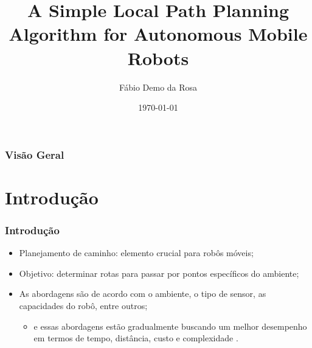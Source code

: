 \documentclass[xcolor=dvipsnames, aspectratio=169]{beamer}
\title[A Simple Local Path Planning Algorithm for Autonomous Mobile Robots]{A Simple Local Path Planning Algorithm for Autonomous Mobile Robots} %
\author[FDR]{Fábio Demo da Rosa} %
\institute[UFSM] %
{
Universidade Federal de Santa Maria \\ %
Pós-Graduação em Ciência da Computação \\
Disciplina de Robótica Móvel\\
\medskip
\textit{faberdemo@gmail.com} %
}
\date{\today} %
\begin{document}
\begin{frame}
\titlepage %
\end{frame}

\begin{frame}
\frametitle{Visão Geral} %
\tableofcontents %
\end{frame}


\section{Introdução}
\begin{frame}
  \frametitle{Introdução}
  \begin{itemize}
    \item Planejamento de caminho: elemento crucial para robôs móveis;
    \item Objetivo: determinar rotas para passar por pontos específicos do ambiente;
    \item As abordagens são de acordo com o ambiente, o tipo de sensor, as capacidades do robô, entre outros;
    \begin{itemize}
      \item e essas abordagens estão gradualmente buscando um melhor desempenho em termos de tempo, distância, custo e complexidade \cite{buniyamin2011simple}.
    \end{itemize}
  \end{itemize}
\end{frame}

\end{document}
